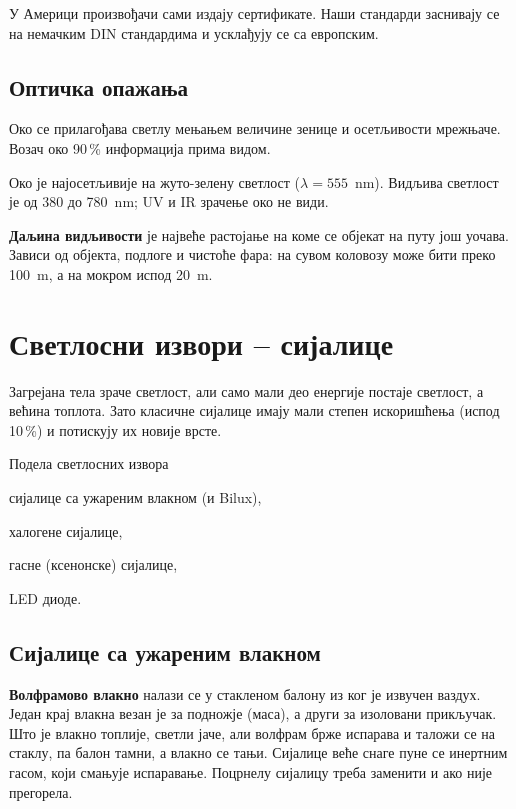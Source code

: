 \documentclass{report}
\begin{document}
У Америци произвођачи сами издају сертификате. Наши стандарди заснивају се на
немачким DIN стандардима и усклађују се са европским.

\section{Оптичка опажања}

Око се прилагођава светлу мењањем величине зенице и осетљивости мрежњаче.
Возач око 90\,\% информација прима видом.

\begin{kljucno}
Око је најосетљивије на жуто-зелену светлост ($\lambda = 555$~nm). Видљива
светлост је од 380 до 780~nm; UV и IR зрачење око не види.
\end{kljucno}

\textbf{Даљина видљивости} је највеће растојање на коме се објекат на путу
још уочава. Зависи од објекта, подлоге и чистоће фара: на сувом коловозу може
бити преко 100~m, а на мокром испод 20~m.

\chapter{Светлосни извори -- сијалице}

Загрејана тела зраче светлост, али само мали део енергије постаје светлост, а
већина топлота. Зато класичне сијалице имају мали степен искоришћења (испод
10\,\%) и потискују их новије врсте.

\begin{podela}{Подела светлосних извора}
\begin{lista}
    \item сијалице са ужареним влакном (и Bilux),
    \item халогене сијалице,
    \item гасне (ксенонске) сијалице,
    \item LED диоде.
\end{lista}
\end{podela}

\section{Сијалице са ужареним влакном}

\textbf{Волфрамово влакно} налази се у стакленом балону из ког је извучен
ваздух. Један крај влакна везан је за подножје (маса), а други за изоловани
прикључак. Што је влакно топлије, светли јаче, али волфрам брже испарава и
таложи се на стаклу, па балон тамни, а влакно се тањи. Сијалице веће снаге
пуне се инертним гасом, који смањује испаравање. Поцрнелу сијалицу треба
заменити и ако није прегорела.
\end{document}
